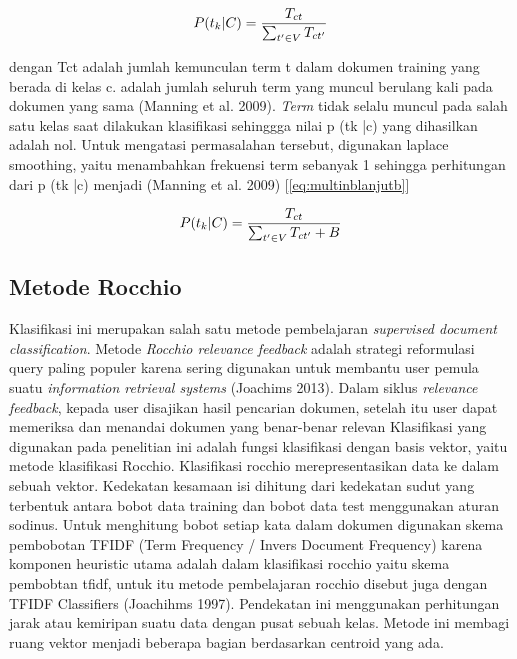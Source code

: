 \begin{equation}
\begin{split}
\tiny
P(t_k|C) = \frac{T_{ct}}{\sum _{t' \in V} T_{ct'}}
\label{eq:multinblanjut}
\normalsize
\end{split}
\end{equation}

dengan Tct adalah jumlah kemunculan term t dalam dokumen training yang berada di kelas c.  adalah jumlah seluruh term yang muncul berulang kali pada dokumen yang sama (Manning et al. 2009).
\textit{Term} tidak selalu muncul pada salah satu kelas saat dilakukan klasifikasi sehinggga nilai p (tk |c) yang dihasilkan adalah nol. Untuk mengatasi permasalahan tersebut, digunakan laplace smoothing, yaitu menambahkan frekuensi term sebanyak 1 sehingga perhitungan dari p (tk |c)  menjadi (Manning et al. 2009)    
[\ref{eq:multinblanjutb}]

\begin{equation}
\begin{split}
\tiny
P(t_k|C) = \frac{T_{ct}}{\sum _{t' \in V} T_{ct'} + B}
\label{eq:multinblanjutb}
\normalsize
\end{split}
\end{equation}

\subsection*{Metode Rocchio}
Klasifikasi ini merupakan salah satu metode pembelajaran \textit{supervised document classification}. Metode \textit{Rocchio relevance feedback} adalah strategi reformulasi query paling populer karena sering digunakan untuk membantu user pemula suatu \textit{information retrieval systems} (Joachims 2013). Dalam siklus \textit{relevance feedback}, kepada user disajikan hasil pencarian dokumen, setelah itu user dapat memeriksa dan menandai dokumen yang benar-benar relevan Klasifikasi yang digunakan pada penelitian ini adalah fungsi klasifikasi dengan basis vektor, yaitu metode klasifikasi Rocchio. Klasifikasi rocchio merepresentasikan data ke dalam sebuah vektor. Kedekatan kesamaan isi dihitung dari kedekatan sudut yang terbentuk antara bobot data training dan bobot data test menggunakan aturan sodinus. Untuk menghitung bobot setiap kata dalam dokumen digunakan skema pembobotan TFIDF (Term Frequency / Invers Document Frequency) karena komponen heuristic utama adalah dalam klasifikasi rocchio yaitu skema pembobtan tfidf, untuk itu metode pembelajaran rocchio disebut juga dengan TFIDF Classifiers (Joachihms 1997). Pendekatan ini menggunakan perhitungan jarak atau kemiripan suatu data dengan pusat sebuah kelas. Metode ini membagi ruang vektor menjadi beberapa bagian berdasarkan centroid yang ada. 

